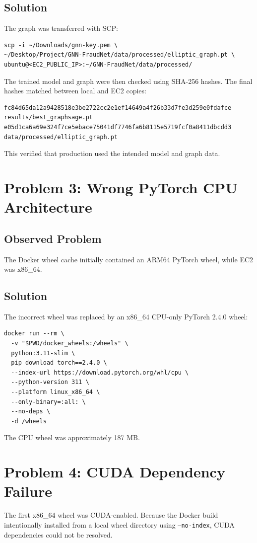 \documentclass[11pt,a4paper]{article}
\begin{document}
\subsection{Solution}
The graph was transferred with SCP:
\begin{lstlisting}
scp -i ~/Downloads/gnn-key.pem \
~/Desktop/Project/GNN-FraudNet/data/processed/elliptic_graph.pt \
ubuntu@<EC2_PUBLIC_IP>:~/GNN-FraudNet/data/processed/
\end{lstlisting}

The trained model and graph were then checked using SHA-256 hashes. The final hashes matched between local and EC2 copies:
\begin{lstlisting}
fc84d65da12a9428518e3be2722cc2e1ef14649a4f26b33d7fe3d259e0fdafce  results/best_graphsage.pt
e05d1ca6a69e324f7ce5ebace75041df7746fa6b8115e5719fcf0a8411dbcdd3  data/processed/elliptic_graph.pt
\end{lstlisting}

This verified that production used the intended model and graph data.

\section{Problem 3: Wrong PyTorch CPU Architecture}
\subsection{Observed Problem}
The Docker wheel cache initially contained an ARM64 PyTorch wheel, while EC2 was x86\_64.

\subsection{Solution}
The incorrect wheel was replaced by an x86\_64 CPU-only PyTorch 2.4.0 wheel:
\begin{lstlisting}
docker run --rm \
  -v "$PWD/docker_wheels:/wheels" \
  python:3.11-slim \
  pip download torch==2.4.0 \
  --index-url https://download.pytorch.org/whl/cpu \
  --python-version 311 \
  --platform linux_x86_64 \
  --only-binary=:all: \
  --no-deps \
  -d /wheels
\end{lstlisting}

The CPU wheel was approximately 187 MB.

\section{Problem 4: CUDA Dependency Failure}
The first x86\_64 wheel was CUDA-enabled. Because the Docker build intentionally installed from a local wheel directory using \texttt{--no-index}, CUDA dependencies could not be resolved.
\end{document}
